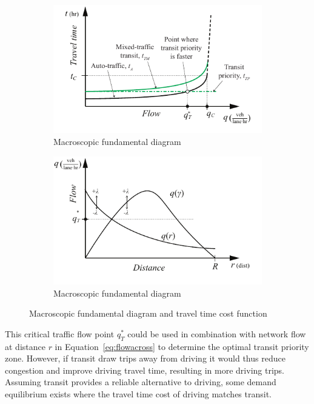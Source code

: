 \documentclass{article}
\begin{document}
\begin{figure}[!ht]
     \centering
     \hfill
     \begin{subfigure}[b]{0.45\textwidth}
         \centering
         \includegraphics[width=\textwidth]{diagram_transit_traveltime}
        \caption{Macroscopic fundamental diagram}
         \label{fig:transittraveltime}
     \end{subfigure}
     \hfill
     \begin{subfigure}[b]{0.45\textwidth}
         \centering
         \includegraphics[width=\textwidth]{diagram_flow_combo}
         \caption{Macroscopic fundamental diagram}
         \label{fig:flowcombo}
     \end{subfigure}
     \hfill
     \caption{Macroscopic fundamental diagram and travel time cost function}
\end{figure}

This critical traffic flow point $q^*_T$ could be used in combination with network flow at distance $r$ in Equation~\eqref{eq:flowacross} to determine the optimal transit priority zone. However, if transit draw trips away from driving it would thus reduce congestion and improve driving travel time, resulting in more driving trips. Assuming transit provides a reliable alternative to driving, some demand equilibrium exists where the travel time cost of driving matches transit.
\end{document}
